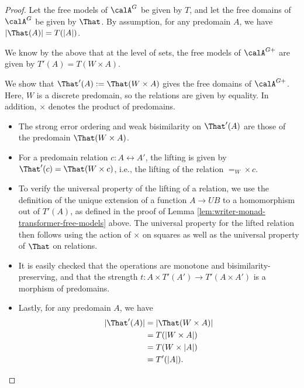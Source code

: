 \begin{proof}
    Let the free models of $\calA^G$ be given by $T$, and let the free domains
    of $\calA^G$ be given by $\That$. By assumption, for any predomain $A$, we
    have $|\That(A)| = T(|A|)$.
    
    We know by the above that at the level of sets, the free models of
    $\calA^{G+}$ are given by $T'(A) = T(W \times A)$.
    
    We show that $\That'(A) := \That(W \times A)$ gives the free domains of
    $\calA^{G+}$. Here, $W$ is a discrete predomain, so the relations are given
    by equality. In addition, $\times$ denotes the product of predomains.

    \begin{itemize}
        \item The strong error ordering and weak bisimilarity on $\That'(A)$ are
        those of the predomain $\That(W \times A)$.

        \item For a predomain relation $c : A \rel A'$, the lifting is given by
        $\That'(c) = \That(W \times c)$, i.e., the lifting of the relation $=_W \times c$.

        \item To verify the universal property of the lifting of a relation, we
        use the definition of the unique extension of a function $A \to UB$ to a
        homomorphism out of $T'(A)$, as defined in the proof of Lemma
        \ref{lem:writer-monad-transformer-free-models} above. The universal
        property for the lifted relation then follows using the action of
        $\times$ on squares as well as the universal property of $\That$ on
        relations.

        \item It is easily checked that the operations are monotone and
        bisimilarity-preserving, and that the strength $t : A \times T'(A') \to
        T'(A \times A')$ is a morphism of predomains.
        
        \item Lastly, for any predomain $A$, we have
        \begin{align*}
            |\That'(A)| &= |\That(W \times A)| \\
                        &= T(|W \times A|) \\
                        &= T(W \times |A|)  \\
                        &= T'(|A|).
        \end{align*}
    \end{itemize}
\end{proof}

